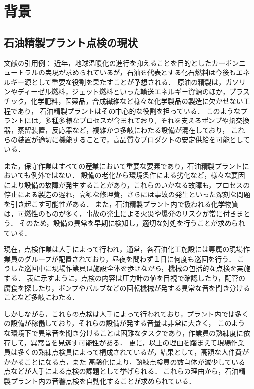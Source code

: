 \documentclass[../main]{subfiles}
\begin{document}

\section{背景}
\label{sec:intro_background}
\subsection{石油精製プラント点検の現状}
\label{sec:intro_plant_current}
文献の引用例：\cite{fujita2023acoustic}
近年，地球温暖化の進行を抑えることを目的としたカーボンニュートラルの実現が求められているが，石油を代表とする化石燃料は今後もエネルギー源として重要な役割を果たすことが予想される．
原油の精製は，ガソリンやディーゼル燃料，ジェット燃料といった輸送エネルギー資源のほか，プラスチック，化学肥料，医薬品，合成繊維など様々な化学製品の製造に欠かせない工程であり，
石油精製プラントはその中心的な役割を担っている．
このようなプラントには，多種多様なプロセスが含まれており，それを支えるポンプや熱交換器，蒸留装置，反応器など，複雑かつ多岐にわたる設備が混在しており，
これらの装置が適切に機能することで，高品質なプロダクトの安定供給を可能としている．

また，保守作業はすべての産業において重要な要素であり，石油精製プラントにおいても例外ではない．
設備の老化から環境条件による劣化など，様々な要因により設備の故障が発生することがあり，これらのいかなる故障も，プロセスの停止による製造の遅れ，高額な修理費，さらには事故の発生といった深刻な問題を引き起こす可能性がある．
また，石油精製プラント内で扱われる化学物質は，可燃性のものが多く，事故の発生による火災や爆発のリスクが常に付きまとう．
そのため，設備の異常を早期に検知し，適切な対処を行うことが求められている．

現在，点検作業は人手によって行われ，通常，各石油化工施設には専属の現場作業員のグループが配置されており，昼夜を問わず１日に何度も巡回を行う．
こうした巡回中に現場作業員は施設全体を歩きながら，機械の包括的な点検を実施する．
表に示すように，点検の内容は圧力計の値を目視で確認したり，配管の腐食を探したり，ポンプやバルブなどの回転機械が発する異常な音を聞き分けることなど多岐にわたる．

しかしながら，これらの点検は人手によって行われており，プラント内では多くの設備が稼働しており，それらの設備が発する音量は非常に大きく，
このような環境下で異常音を聞き分けることは困難なタスクであり，作業員の熟練度に依存して，異常音を見逃す可能性がある．
更に，以上の理由を踏まえて現場作業員は多くの熟練点検員によって構成されているが，結果として，高額な人件費がかかることになる点，また
高齢化により，熟練点検員の数自体が減少している点などが人手による点検の課題として挙げられる．
これらの理由から，石油精製プラント内の音響点検を自動化することが求められている．
\end{document}
